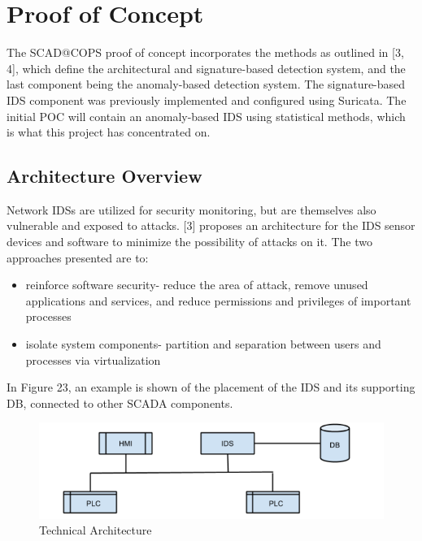 \documentclass[11pt,]{article}
\begin{document}
\clearpage

\section{Proof of Concept}\label{proof-of-concept}

The SCAD@COPS proof of concept incorporates the methods as outlined in
{[}3, 4{]}, which define the architectural and signature-based detection
system, and the last component being the anomaly-based detection system.
The signature-based IDS component was previously implemented and
configured using Suricata. The initial POC will contain an anomaly-based
IDS using statistical methods, which is what this project has
concentrated on.

\subsection{Architecture Overview}\label{architecture-overview}

Network IDSs are utilized for security monitoring, but are themselves
also vulnerable and exposed to attacks. {[}3{]} proposes an architecture
for the IDS sensor devices and software to minimize the possibility of
attacks on it. The two approaches presented are to:

\begin{itemize}
\itemsep1pt\parskip0pt
\item
  reinforce software security- reduce the area of attack, remove unused
  applications and services, and reduce permissions and privileges of
  important processes
\item
  isolate system components- partition and separation between users and
  processes via virtualization
\end{itemize}

In Figure 23, an example is shown of the placement of the IDS and its
supporting DB, connected to other SCADA components.

\begin{figure}[h]

{\centering \includegraphics{thesis_files/figure-latex/unnamed-chunk-35-1} 

}

\caption{Technical Architecture}\label{fig:unnamed-chunk-35}
\end{figure}
\end{document}
